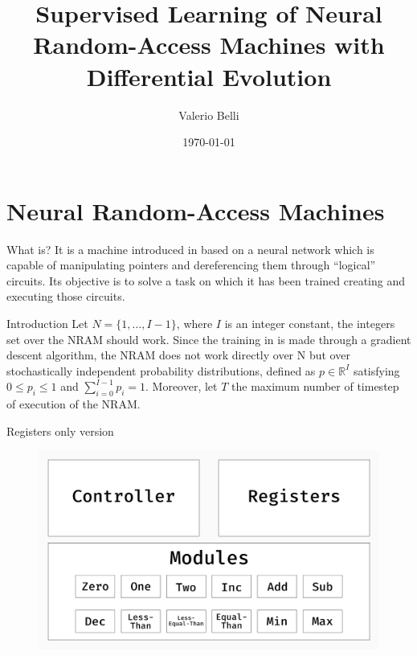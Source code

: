 \documentclass[xcolor={usenames}]{beamer}
\title{Supervised Learning of Neural Random-Access Machines with Differential Evolution}
\date{\today}
\author{Valerio Belli}
\institute{Università degli Studi di Perugia}
\begin{document}
  \maketitle
  \section{Neural Random-Access Machines}
  \begin{frame}{What is?}
	It is a machine introduced in \cite{NRAM:2016} based on a neural network which is capable of manipulating pointers and dereferencing them through ``logical'' circuits. Its objective is to solve a task on which it has been trained creating and executing those circuits.
  \end{frame}
  \begin{frame}{Introduction}
  	Let $N = \{ 1, \dots, I - 1 \}$, where $I$ is an integer constant, the integers set over the NRAM should work. Since the training in \cite{NRAM:2016} is made through a gradient descent algorithm, the NRAM does not work directly over N but over stochastically independent probability distributions, defined as $p \in \mathbb{R}^{I}$ satisfying $0 \leq p_i \leq 1$ and $\sum\limits_{i=0}^{I - 1} p_i = 1$. Moreover, let $T$ the maximum number of timestep of execution of the NRAM.
  \end{frame}
  \begin{frame}{Registers only version}
  	\begin{figure}
  		\centering
  		\includegraphics[width=\textwidth]{../figures/schema-nram-without-memory.png}
  	\end{figure}
  \end{frame}
\end{document}
